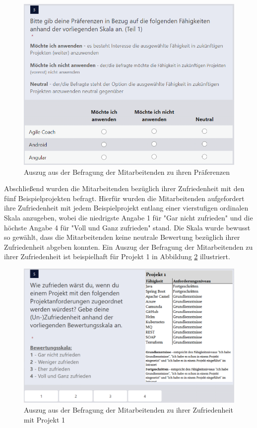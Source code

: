 \begin{figure}[H]
    \centering
	\includegraphics[width=1\textwidth]{gfx/befragung-praeferenzen.png}
	\caption[Auszug aus der Befragung der Mitarbeitenden zu ihren Präferenzen]{Auszug aus der Befragung der Mitarbeitenden zu ihren Präferenzen}
	\label{fig:methodik:abb4}
\end{figure}

Abschließend wurden die Mitarbeitenden bezüglich ihrer Zufriedenheit mit den fünf Beispielprojekten befragt.
Hierfür wurden die Mitarbeitenden aufgefordert ihre Zufriedenheit mit jedem Beispielprojekt entlang einer vierstufigen ordinalen Skala anzugeben, wobei die niedrigste Angabe 1 für "Gar nicht zufrieden" und die höchste Angabe 4 für "Voll und Ganz zufrieden" stand.
Die Skala wurde bewusst so gewählt, dass die Mitarbeitenden keine neutrale Bewertung bezüglich ihrer Zufriedenheit abgeben konnten.
Ein Auszug der Befragung der Mitarbeitenden zu ihrer Zufriedenheit ist beispielhaft für Projekt 1 in Abbildung \ref{fig:methodik:abb5} illustriert.

\begin{figure}[H]
    \centering
	\includegraphics[width=1\textwidth]{gfx/befragung-zufriedenheit.png}
	\caption[Auszug aus der Befragung der Mitarbeitenden zu ihrer Zufriedenheit mit Projekt 1]{Auszug aus der Befragung der Mitarbeitenden zu ihrer Zufriedenheit mit Projekt 1}
	\label{fig:methodik:abb5}
\end{figure}

